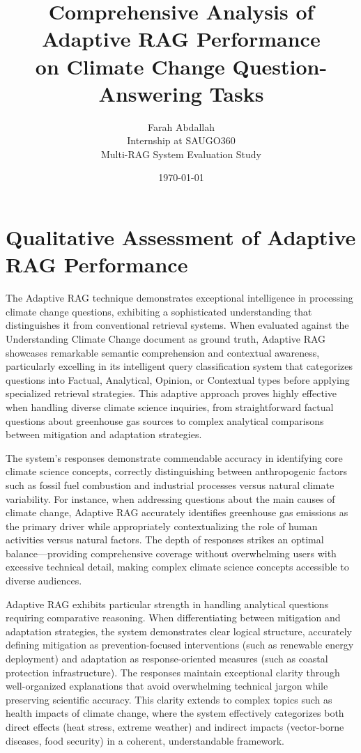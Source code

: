 \documentclass[12pt,a4paper]{article}
\title{\textbf{Comprehensive Analysis of Adaptive RAG Performance \\
on Climate Change Question-Answering Tasks}}
\author{Farah Abdallah\\
Internship at SAUGO360\\
Multi-RAG System Evaluation Study}
\date{\today}
\begin{document}
\maketitle

\tableofcontents
\newpage

\section{Qualitative Assessment of Adaptive RAG Performance}

The Adaptive RAG technique demonstrates exceptional intelligence in processing climate change questions, exhibiting a sophisticated understanding that distinguishes it from conventional retrieval systems. When evaluated against the Understanding Climate Change document as ground truth, Adaptive RAG showcases remarkable semantic comprehension and contextual awareness, particularly excelling in its intelligent query classification system that categorizes questions into Factual, Analytical, Opinion, or Contextual types before applying specialized retrieval strategies. This adaptive approach proves highly effective when handling diverse climate science inquiries, from straightforward factual questions about greenhouse gas sources to complex analytical comparisons between mitigation and adaptation strategies.

The system's responses demonstrate commendable accuracy in identifying core climate science concepts, correctly distinguishing between anthropogenic factors such as fossil fuel combustion and industrial processes versus natural climate variability. For instance, when addressing questions about the main causes of climate change, Adaptive RAG accurately identifies greenhouse gas emissions as the primary driver while appropriately contextualizing the role of human activities versus natural factors. The depth of responses strikes an optimal balance—providing comprehensive coverage without overwhelming users with excessive technical detail, making complex climate science concepts accessible to diverse audiences.

Adaptive RAG exhibits particular strength in handling analytical questions requiring comparative reasoning. When differentiating between mitigation and adaptation strategies, the system demonstrates clear logical structure, accurately defining mitigation as prevention-focused interventions (such as renewable energy deployment) and adaptation as response-oriented measures (such as coastal protection infrastructure). The responses maintain exceptional clarity through well-organized explanations that avoid overwhelming technical jargon while preserving scientific accuracy. This clarity extends to complex topics such as health impacts of climate change, where the system effectively categorizes both direct effects (heat stress, extreme weather) and indirect impacts (vector-borne diseases, food security) in a coherent, understandable framework.
\end{document}
